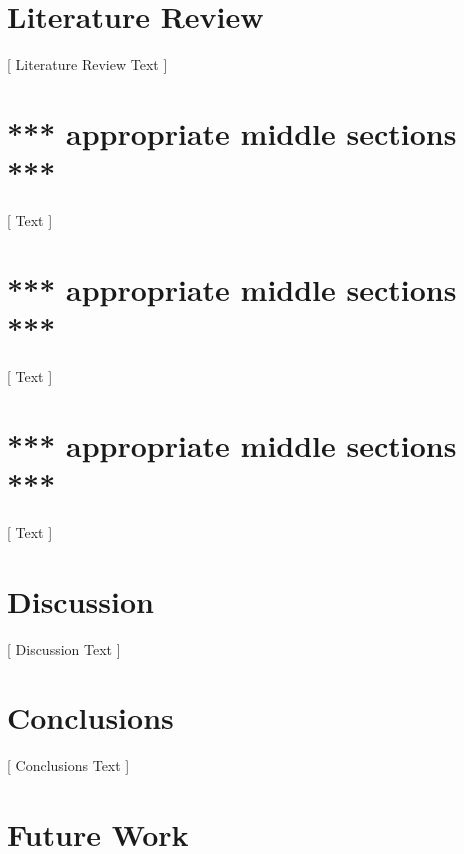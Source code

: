 \documentclass[12pt]{article}
\begin{document}
\section{Literature Review}
\label{sec:literature_review}

[ Literature Review Text ]







\section{*** appropriate middle sections ***}
\label{sec:1}

[ Text ]



\section{*** appropriate middle sections ***}
\label{sec:2}

[ Text ]



\section{*** appropriate middle sections ***}
\label{sec:3}

[ Text ]



\section{Discussion}
\label{sec:discussion}

[ Discussion Text ]









\section{Conclusions}
\label{sec:conclusions}

[ Conclusions Text ]








\section{Future Work}
\label{sec:future_work}
\end{document}
